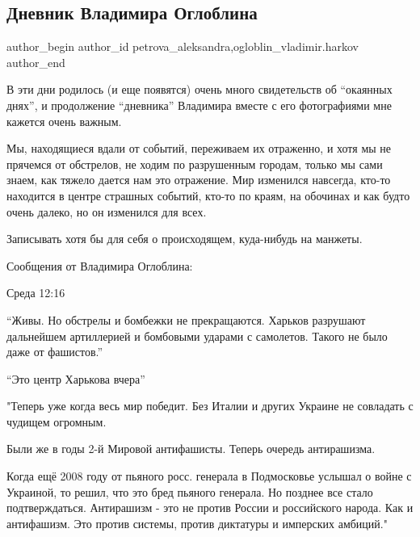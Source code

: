  
 
 
 
 
 
\subsection{Дневник Владимира Оглоблина}
\label{sec:05_03_2022.fb.petrova_aleksandra.1.dnevnik_ogloblin}
 
\ifcmt
 author_begin
   author_id petrova_aleksandra,ogloblin_vladimir.harkov
 author_end
\fi

В эти дни родилось (и еще появятся) очень много свидетельств об \enquote{окаянных
днях}, и продолжение \enquote{дневника} Владимира вместе с его фотографиями мне кажется
очень важным. 

Мы, находящиеся вдали от событий, переживаем их отраженно, и хотя мы не
прячемся от обстрелов, не ходим по разрушенным городам, только мы сами знаем,
как тяжело дается нам это отражение. Мир изменился навсегда, кто-то находится в
центре страшных событий, кто-то по краям, на обочинах и как будто очень далеко,
но он изменился для всех. 

Записывать хотя бы для себя о происходящем, куда-нибудь на манжеты.


Сообщения от Владимира Оглоблина:

Среда 12:16

\enquote{Живы. Но обстрелы и бомбежки не прекращаются. Харьков разрушают дальнейшем
артиллерией и бомбовыми ударами с самолетов. Такого не было даже от фашистов.}

\enquote{Это центр Харькова вчера}

"Теперь уже когда весь мир победит. Без Италии и других Украине не совладать с
чудищем огромным.

Были же в годы 2-й Мировой антифашисты. Теперь очередь антирашизма. 

Когда ещё 2008 году от пьяного росс. генерала в Подмосковье услышал о войне с
Украиной, то решил, что это бред пьяного генерала. Но позднее все стало
подтверждаться. Антирашизм - это не против России и российского народа. Как и
антифашизм. Это против системы, против диктатуры и имперских амбиций."

